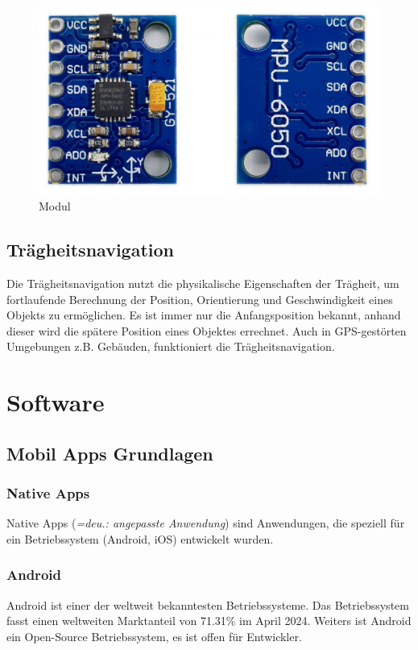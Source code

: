 \begin{figure}[H]
	\centering
	\includegraphics[width=0.7\linewidth]{images/Modul.jpg}
	\caption[Modul]{Modul}
	\label{fig:Modul}
\end{figure}

\subsection{Trägheitsnavigation}

Die Trägheitsnavigation nutzt die physikalische Eigenschaften der Trägheit, um fortlaufende Berechnung der Position, Orientierung und Geschwindigkeit eines Objekts zu ermöglichen. \parencite{Traegheitsnavigation} Es ist immer nur die Anfangsposition bekannt, anhand dieser wird die spätere Position eines Objektes errechnet. Auch in GPS-gestörten Umgebungen z.B. Gebäuden, funktioniert die Trägheitsnavigation. 


\section{Software}


\subsection{Mobil Apps Grundlagen}

\subsubsection{Native Apps}

Native Apps (\textit{=deu.: angepasste Anwendung}) sind Anwendungen, die speziell für ein Betriebssystem (Android, iOS) entwickelt wurden.

\subsubsection{Android}

Android ist einer der weltweit bekanntesten Betriebssysteme. Das Betriebssystem fasst einen weltweiten Marktanteil von 71.31\% im April 2024. \parencite{AndroidVsiOS} Weiters ist Android ein Open-Source Betriebssystem, es ist offen für Entwickler.  

